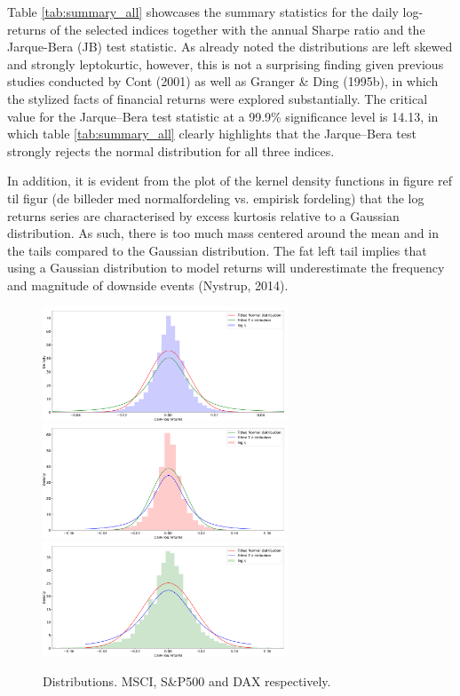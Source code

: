 Table \ref{tab:summary_all} showcases the summary statistics for the daily log-returns of the selected indices together with the annual Sharpe ratio and the Jarque-Bera (JB) test statistic. As already noted the distributions are left skewed and strongly leptokurtic, however, this is not a surprising finding given previous studies conducted by Cont (2001) as well as Granger \& Ding (1995b), in which the stylized facts of financial returns were explored substantially. The critical value for the Jarque–Bera test statistic at a 99.9\% significance level is 14.13, in which table \ref{tab:summary_all} clearly highlights that the Jarque–Bera test strongly rejects the normal distribution for all three indices.  

In addition, it is evident from the plot of the kernel density functions in figure ref til figur (de billeder med normalfordeling vs. empirisk fordeling) that the log returns series are characterised by excess kurtosis relative to a Gaussian distribution. As such, there is too much mass centered around the mean and in the tails compared to the Gaussian distribution. The fat left tail implies that using a Gaussian distribution to model returns will underestimate the frequency and magnitude of downside events (Nystrup, 2014). 

\begin{figure}[H] 
    \centering
    \includegraphics[width=0.65\textwidth]{analysis/data_description/images/MSCI_distribution.png}
    \includegraphics[width=0.65\textwidth]{analysis/data_description/images/SP500_distribution.png}
    \includegraphics[width=0.65\textwidth]{analysis/data_description/images/DAX_distribution.png}
    \caption{Distributions. MSCI, S\&P500 and DAX respectively.}
    \label{fig: Kernel_distributions}
\end{figure}

